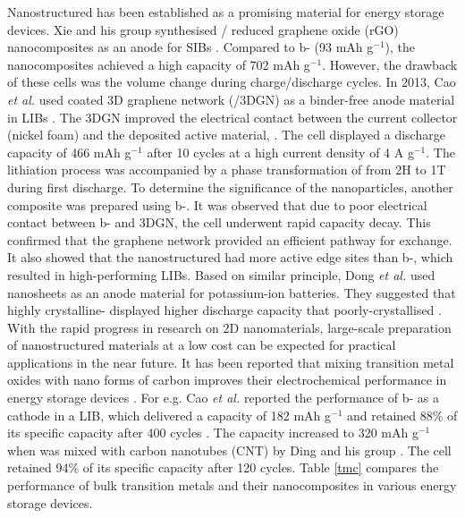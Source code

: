 Nanostructured  has been established as a promising material for energy storage devices. Xie and his group synthesised / reduced graphene oxide (rGO) nanocomposites as an anode for SIBs \cite{xie_mos2/graphene_2015}. Compared to b- (93 mAh g$^{-1}$), the nanocomposites achieved a high capacity of 702 mAh g$^{-1}$. However, the drawback of these cells was the volume change during charge/discharge cycles. In 2013, Cao \textit{et al.} used  coated 3D graphene network (/3DGN) as a binder-free anode material in LIBs \cite{cao_preparation_2013}. The 3DGN improved the electrical contact between the current collector (nickel foam) and the deposited active material, . The cell displayed a discharge capacity of 466 mAh g$^{-1}$ after 10 cycles at a  high current density of 4 A g$^{-1}$. The lithiation process was accompanied by a phase transformation of  from 2H to 1T during first discharge. To determine the significance of the  nanoparticles, another composite was prepared using b-. It was observed that due to poor electrical contact between b- and 3DGN, the cell underwent rapid capacity decay. This confirmed that the graphene network provided an efficient pathway for  exchange. It also showed that the nanostructured  had more active edge sites than b-, which resulted in high-performing LIBs. Based on similar principle, Dong \textit{et al.} used  nanosheets as an anode material for potassium-ion batteries. They suggested that highly crystalline- displayed higher discharge capacity that poorly-crystallised  \cite{dong_insights_2019}. With the rapid progress in research on 2D nanomaterials, large-scale preparation of nanostructured materials at a low cost can be expected for practical applications in the near future. It has been reported that mixing transition metal oxides with nano forms of carbon improves their electrochemical performance in energy storage devices \cite{acerce_metallic_2015-1,zhao_flexible_2015,hu_hierarchical_2015,cao_preparation_2013,ding_facile_2012}. For e.g. Cao \textit{et al.} reported the performance of b- as a cathode in a LIB, which delivered a capacity of 182 mAh g$^{-1}$ and retained 88\% of its specific capacity after 400 cycles \cite{cao_preparation_2013}. The capacity increased to 320 mAh g$^{-1}$ when  was mixed with carbon nanotubes (CNT) by Ding and his group \cite{ding_facile_2012}. The cell retained 94\% of its specific capacity after 120 cycles. Table \ref{tmc} compares the performance of bulk transition metals and their nanocomposites in various energy storage devices. 

